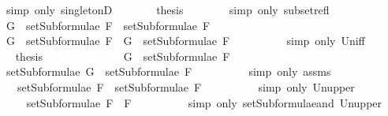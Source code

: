 \begin{isabellebody}
\ {\isacharparenleft}simp\ only{\isacharcolon}\ singletonD{\isacharparenright}\isanewline
\ \ \ \ \isamarkupfalse%
\ \isamarkupfalse%
\ {\isacharquery}thesis\isanewline
\ \ \ \ \ \ \isamarkupfalse%
\ {\isacharparenleft}simp\ only{\isacharcolon}\ subset{\isacharunderscore}refl{\isacharparenright}\isanewline
\ \ \isamarkupfalse%
\isanewline
\ \ \ \ \isamarkupfalse%
\ {\isachardoublequoteopen}G\ {\isasymin}\ setSubformulae\ F{}\ {\isasymunion}\ setSubformulae\ F{}{\isachardoublequoteclose}\isanewline
\ \ \ \ \isamarkupfalse%
\ \isamarkupfalse%
\ {\isachardoublequoteopen}G\ {\isasymin}\ setSubformulae\ F{}\ {\isasymor}\ G\ {\isasymin}\ setSubformulae\ F{}{\isachardoublequoteclose}\ \ \isanewline
\ \ \ \ \ \ \isamarkupfalse%
\ {\isacharparenleft}simp\ only{\isacharcolon}\ Un{\isacharunderscore}iff{\isacharparenright}\isanewline
\ \ \ \ \isamarkupfalse%
\ \isamarkupfalse%
\ {\isacharquery}thesis\isanewline
\ \ \ \ \isamarkupfalse%
\ \isanewline
\ \ \ \ \ \ \isamarkupfalse%
\ {\isachardoublequoteopen}G\ {\isasymin}\ setSubformulae\ F{}{\isachardoublequoteclose}\isanewline
\ \ \ \ \ \ \isamarkupfalse%
\ \isamarkupfalse%
\ {\isachardoublequoteopen}setSubformulae\ G\ {\isasymsubseteq}\ setSubformulae\ F{}{\isachardoublequoteclose}\isanewline
\ \ \ \ \ \ \ \ \isamarkupfalse%
\ {\isacharparenleft}simp\ only{\isacharcolon}\ assms{\isacharparenleft}{}{\isacharparenright}{\isacharparenright}\isanewline
\ \ \ \ \ \ \isamarkupfalse%
\ \isamarkupfalse%
\ {\isachardoublequoteopen}{\isasymdots}\ {\isasymsubseteq}\ setSubformulae\ F{}\ {\isasymunion}\ setSubformulae\ F{}{\isachardoublequoteclose}\isanewline
\ \ \ \ \ \ \ \ \isamarkupfalse%
\ {\isacharparenleft}simp\ only{\isacharcolon}\ Un{\isacharunderscore}upper{}{\isacharparenright}\isanewline
\ \ \ \ \ \ \isamarkupfalse%
\ \isamarkupfalse%
\ {\isachardoublequoteopen}{\isasymdots}\ {\isasymsubseteq}\ setSubformulae\ {\isacharparenleft}F{}\ \isactrlbold {\isasymand}\ F{}{\isacharparenright}{\isachardoublequoteclose}\isanewline
\ \ \ \ \ \ \ \ \isamarkupfalse%
\ {\isacharparenleft}simp\ only{\isacharcolon}\ setSubformulae{\isacharunderscore}and\ Un{\isacharunderscore}upper{}{\isacharparenright}\isanewline

\end{isabellebody}
